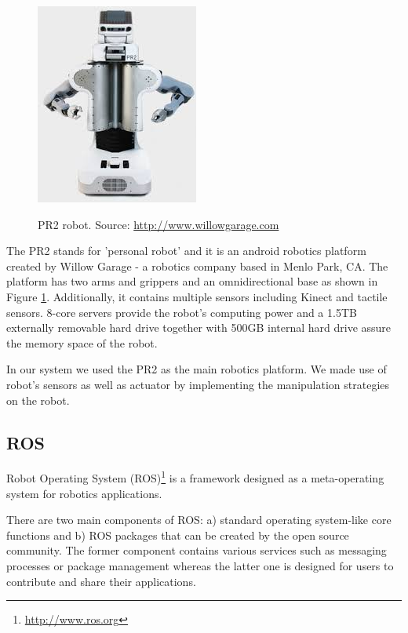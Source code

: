 \begin{figure}
\centering

{\includegraphics[width=0.5\columnwidth]{figures/pr2.jpeg}}

\caption{PR2 robot. Source: \url{http://www.willowgarage.com}}
\label{fig:pr2}
\end{figure}

The PR2 stands for 'personal robot' and it is an android robotics platform created by Willow Garage - a robotics company based in Menlo Park, CA. The platform has two arms and grippers and an omnidirectional base as shown in Figure \ref{fig:pr2}. Additionally, it contains multiple sensors including Kinect and tactile sensors. 8-core servers provide the robot's computing power and a 1.5TB externally removable hard drive together with 500GB internal hard drive assure the memory space of the robot.  

In our system we used the PR2 as the main robotics platform. We made use of robot's sensors as well as actuator by implementing the manipulation strategies on the robot.

\subsection{ROS}
Robot Operating System (ROS)\footnote{\url{http://www.ros.org}} is a framework designed as a meta-operating system for robotics applications. 

There are two main components of ROS: a) standard operating system-like core functions and b) ROS packages that can be created by the open source community. The former component contains various services such as messaging processes or package management whereas the latter one is designed for users to contribute and share their applications. 


